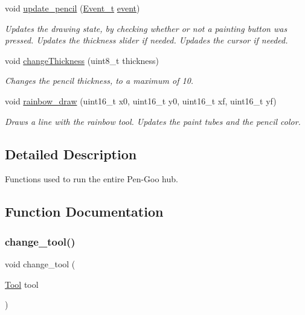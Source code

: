 \begin{DoxyCompactItemize}
void \mbox{\hyperlink{group__pengoo_ga3df244ae6ccf0baca3f8426c306d3802}{update\+\_\+pencil}} (\mbox{\hyperlink{struct_event__t}{Event\+\_\+t}} \mbox{\hyperlink{pengoo_8c_af662780d461acf9ac3b1321884e7cb01}{event}})
\begin{DoxyCompactList}\small\item\em Updates the drawing state, by checking whether or not a painting button was pressed. Updates the thickness slider if needed. Updades the cursor if needed. \end{DoxyCompactList}\item 
void \mbox{\hyperlink{group__pengoo_ga771576cc26d893bc389c414f151af27f}{change\+Thickness}} (uint8\+\_\+t thickness)
\begin{DoxyCompactList}\small\item\em Changes the pencil thickness, to a maximum of 10. \end{DoxyCompactList}\item 
void \mbox{\hyperlink{group__pengoo_ga113731d7452fe7de36fbd2f4c90e0cb3}{rainbow\+\_\+draw}} (uint16\+\_\+t x0, uint16\+\_\+t y0, uint16\+\_\+t xf, uint16\+\_\+t yf)
\begin{DoxyCompactList}\small\item\em Draws a line with the rainbow tool. Updates the paint tubes and the pencil color. \end{DoxyCompactList}\end{DoxyCompactItemize}


\subsection{Detailed Description}
Functions used to run the entire Pen-\/\+Goo hub. 

\subsection{Function Documentation}
\mbox{\label{group__pengoo_gac36b16b3f3b197d1e93926a0b5ba1396}} 
\subsubsection{\texorpdfstring{change\+\_\+tool()}{change\_tool()}}
{\footnotesize\ttfamily void change\+\_\+tool (\begin{DoxyParamCaption}\item[{\mbox{\hyperlink{group__game__state_ga8cdac3f25ed2be17d210ff50defe0791}{Tool}}}]{tool }\end{DoxyParamCaption})}



